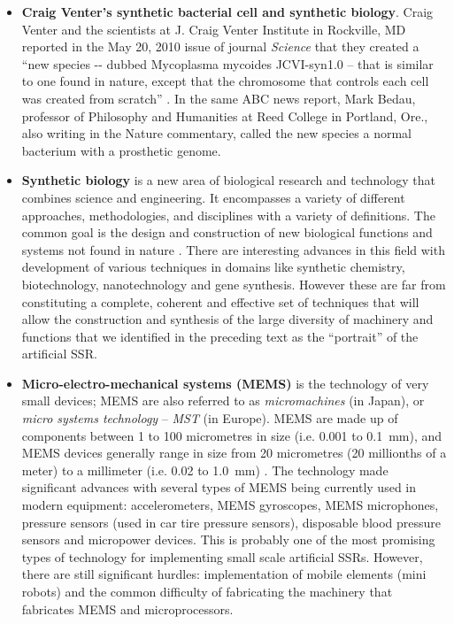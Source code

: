 \documentclass[letterpaper]{article}
\begin{document}
\begin{itemize}
\item \textbf{Craig Venter’s synthetic bacterial cell and synthetic
biology}. Craig Venter and the scientists at
\textcolor[rgb]{0.2,0.2,0.2}{J. Craig Venter Institute in Rockville, MD
reported in the May 20, 2010 issue of journal
}\textit{\textcolor[rgb]{0.2,0.2,0.2}{Science}}\textcolor[rgb]{0.2,0.2,0.2}{
that they created a “new species -{}- dubbed Mycoplasma mycoides
JCVI-syn1.0 – that is similar to one found in nature, except that the
chromosome that controls each cell was created from scratch”
}\textcolor[rgb]{0.2,0.2,0.2}{. In the same ABC news report,
}\textcolor[rgb]{0.2,0.2,0.2}{Mark Bedau, professor of Philosophy and
Humanities at Reed College in Portland, Ore., also writing in the
Nature commentary, called the new species {\textquotedbl}a normal
bacterium with a prosthetic genome.{\textquotedbl} }
\end{itemize}

\bigskip

\begin{itemize}
\item \textbf{\textcolor[rgb]{0.2,0.2,0.2}{Synthetic
biology}}\textcolor[rgb]{0.2,0.2,0.2}{ }is a new area of biological
research and technology that combines science and engineering. It
encompasses a variety of different approaches, methodologies, and
disciplines with a variety of definitions. The common goal is the
design and construction of new biological functions and systems not
found in nature . There are interesting advances in this field with
development of various techniques in domains like synthetic chemistry,
biotechnology, nanotechnology and gene synthesis. However these are far
from constituting a complete, coherent and effective set of techniques
that will allow the construction and synthesis of the large diversity
of machinery and functions that we identified in the preceding text as
the “portrait” of the artificial SSR.
\end{itemize}

\bigskip

\begin{itemize}
\item \textbf{Micro-electro-mechanical systems (MEMS)} is the technology
of very small devices; MEMS are also referred to as
\textit{micromachines} (in Japan), or \textit{micro systems technology}
– \textit{MST} (in Europe). MEMS are made up of components between 1 to
100 micrometres in size (i.e. 0.001 to 0.1~mm), and MEMS devices
generally range in size from 20 micrometres (20 millionths of a meter)
to a millimeter (i.e. 0.02 to 1.0~mm) . The technology made significant
advances with several types of MEMS being currently used in modern
equipment:  accelerometers, MEMS gyroscopes, MEMS microphones, pressure
sensors (used in car tire pressure sensors), disposable blood pressure
sensors and micropower devices. This is probably one of the most
promising types of technology for implementing small scale artificial
SSRs. However, there are still significant hurdles: implementation of
mobile elements (mini robots) and the common difficulty of fabricating
the machinery that fabricates MEMS and microprocessors.
\end{itemize}
\end{document}
